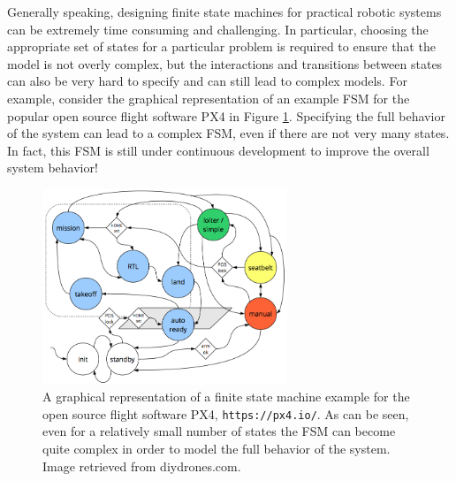 Generally speaking, designing finite state machines for practical robotic systems can be extremely time consuming and challenging. In particular, choosing the appropriate set of states for a particular problem is required to ensure that the model is not overly complex, but the interactions and transitions between states can also be very hard to specify and can still lead to complex models. For example, consider the graphical representation of an example FSM for the popular open source flight software PX4 in Figure \ref{fig:px4fsm}. Specifying the full behavior of the system can lead to a complex FSM, even if there are not very many states. In fact, this FSM is still under continuous development to improve the overall system behavior!
\begin{figure}[ht]
    \centering
    \includegraphics[width=0.65\textwidth]{tex/figs/ch19_figs/px4_state_machine.png}
    \caption{A graphical representation of a finite state machine example for the open source flight software PX4, \texttt{https://px4.io/}. As can be seen, even for a relatively small number of states the FSM can become quite complex in order to model the full behavior of the system. Image retrieved from diydrones.com.}
    \label{fig:px4fsm}
\end{figure}

